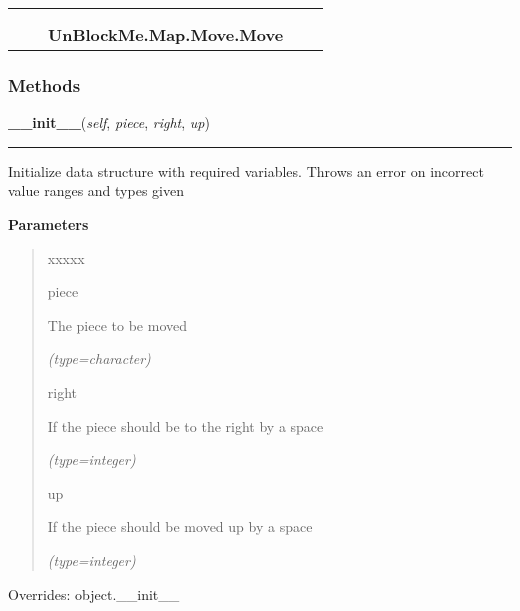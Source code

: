     \label{UnBlockMe:Map:Move:Move}
\begin{tabular}{cccccc}
\multicolumn{2}{r}{\settowidth{\BCL}{object}\multirow{2}{\BCL}{object}}
&&
  \\\cline{3-3}
  &&\multicolumn{1}{c|}{}
&&
  \\
&&\multicolumn{2}{l}{\textbf{UnBlockMe.Map.Move.Move}}
\end{tabular}



  \subsubsection{Methods}

    \vspace{0.5ex}

\hspace{.8\funcindent}\begin{boxedminipage}{\funcwidth}

    \raggedright \textbf{\_\_init\_\_}(\textit{self}, \textit{piece}, \textit{right}, \textit{up})

    \vspace{-1.5ex}

    \rule{\textwidth}{0.5\fboxrule}
\setlength{\parskip}{2ex}
    Initialize data structure with required variables. Throws an error on 
    incorrect value ranges and types given

\setlength{\parskip}{1ex}
      \textbf{Parameters}
      \vspace{-1ex}

      \begin{quote}
        \begin{Ventry}{xxxxx}

          \item[piece]

          The piece to be moved

            {\it (type=character)}

          \item[right]

          If the piece should be to the right by a space

            {\it (type=integer)}

          \item[up]

          If the piece should be moved up by a space

            {\it (type=integer)}

        \end{Ventry}

      \end{quote}

      Overrides: object.\_\_init\_\_

    \end{boxedminipage}

